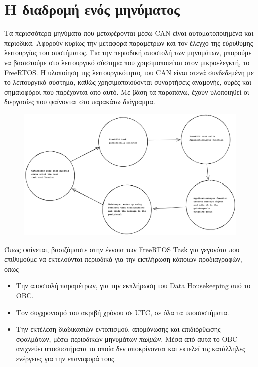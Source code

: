 \documentclass[a4paper,nobib,justified]{tufte-book}
\begin{document}

\section{Η διαδρομή ενός μηνύματος}

Τα περισσότερα μηνύματα που μεταφέρονται μέσω CAN είναι αυτοματοποιημένα και περιοδικά. Αφορούν κυρίως την μεταφορά παραμέτρων και τον έλεγχο της εύρυθυμης λειτουργίας του συστήματος. Για την περιοδική αποστολή των μηνυμάτων, μπορούμε να βασιστούμε στο λειτουργικό σύστημα που χρησιμοποιείται στον μικροελεγκτή, το FreeRTOS. Η υλοποίηση της λειτουργικότητας του CAN είναι στενά συνδεδεμένη με το λειτουργικό σύστημα, καθώς χρησιμοποιούονται συναρτήσεις αναμονής, ουρές και σημαιοφόροι που παρέχονται από αυτό. Με βάση τα παραπάνω, έχουν υλοποιηθεί οι διεργασίες που φαίνονται στο παρακάτω διάγραμμα.

\begin{figure}[ht]
	\includegraphics[width=0.8\pdfpagewidth]{media/diagrams/message-send-fsm.png}
\end{figure}

Όπως φαίνεται, βασιζόμαστε στην έννοια των FreeRTOS Task για γεγονότα που επιθυμούμε να εκτελούνται περιοδικά για την εκπλήρωση κάποιων προδιαγραφών, όπως
\begin{itemize}
	\item Την αποστολή παραμέτρων, για την εκπλήρωση του Data Housekeeping από το OBC.
	\item Τον συγχρονισμό του ακριβή χρόνου σε UTC, σε όλα τα υποσυστήματα.
	\item Την εκτέλεση διαδικασιών εντοπισμού, απομόνωσης και επιδιόρθωσης σφαλμάτων, μέσω περιοδικών μηνυμάτων \emph{παλμών}. Μέσα από αυτά το OBC ανιχνεύει υποσυστήματα τα οποία δεν αποκρίνονται και εκτελεί τις κατάλληλες ενέργειες για την επαναφορά τους. 
\end{itemize}
\end{document}

